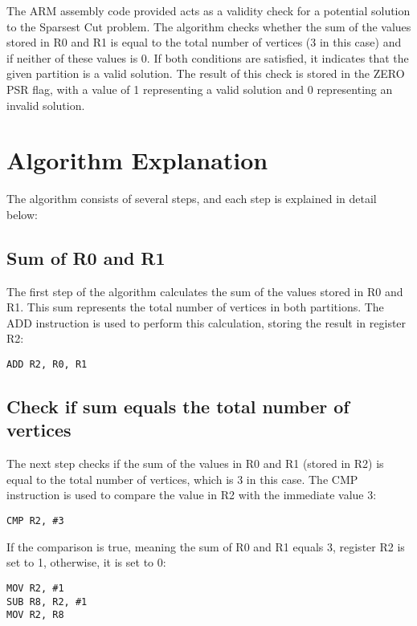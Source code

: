 The ARM assembly code provided acts as a validity check for a potential solution to the Sparsest Cut problem. The algorithm checks whether the sum of the values stored in R0 and R1 is equal to the total number of vertices (3 in this case) and if neither of these values is 0. If both conditions are satisfied, it indicates that the given partition is a valid solution. The result of this check is stored in the ZERO PSR flag, with a value of 1 representing a valid solution and 0 representing an invalid solution.

\section{Algorithm Explanation}

The algorithm consists of several steps, and each step is explained in detail below:

\subsection{Sum of R0 and R1}

The first step of the algorithm calculates the sum of the values stored in R0 and R1. This sum represents the total number of vertices in both partitions. The ADD instruction is used to perform this calculation, storing the result in register R2:

\begin{verbatim}
ADD R2, R0, R1
\end{verbatim}

\subsection{Check if sum equals the total number of vertices}

The next step checks if the sum of the values in R0 and R1 (stored in R2) is equal to the total number of vertices, which is 3 in this case. The CMP instruction is used to compare the value in R2 with the immediate value 3:

\begin{verbatim}
CMP R2, #3
\end{verbatim}

If the comparison is true, meaning the sum of R0 and R1 equals 3, register R2 is set to 1, otherwise, it is set to 0:

\begin{verbatim}
MOV R2, #1
SUB R8, R2, #1
MOV R2, R8
\end{verbatim}

